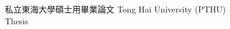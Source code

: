 
%



  \ChiMode %







%
%
%
%
%

\SetTitle %
{私立東海大學碩士用畢業論文} %
{Tong Hai University (PTHU) \\ Thesis }



%
 \MasterDegree %



